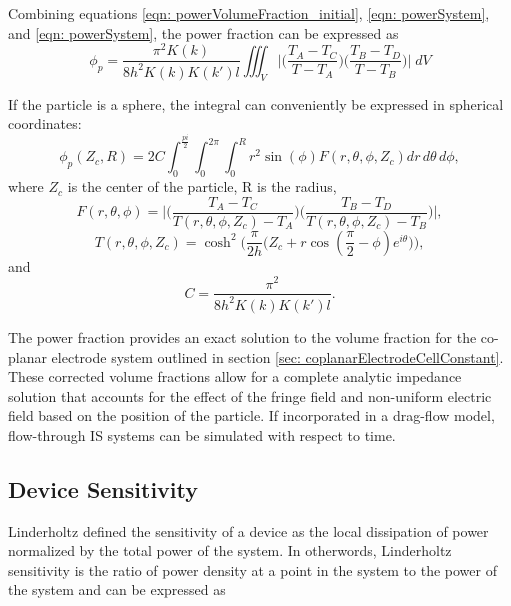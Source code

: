 Combining equations \ref{eqn: powerVolumeFraction_initial}, \ref{eqn: powerSystem}, and \ref{eqn: powerSystem}, the power fraction can be expressed as
\begin{equation}
    \phi_p = \frac{\pi^2 K(k)}{8h^2K(k)K(k')l}\iiint_V \bigg|\bigg(\frac{T_A-T_C}{T-T_A}\bigg)\bigg(\frac{T_B-T_D}{T-T_B}\bigg)\bigg| \;dV
\end{equation}

\par If the particle is a sphere, the integral can conveniently be expressed in spherical coordinates:
\begin{equation}
    \phi_p(Z_c,R) = 2C\int_{0}^\frac{pi}{2}\int_0^{2\pi}\int_0^R r^2 \sin(\phi)F(r,\theta,\phi,Z_c)dr\,d\theta\,d\phi,
\end{equation}
\noindent where $Z_c$ is the center of the particle, R is the radius,
\begin{equation}
    F(r,\theta,\phi) = \bigg|\bigg(\frac{T_A-T_C}{T(r,\theta,\phi,Z_c)-T_A}\bigg)\bigg(\frac{T_B-T_D}{T(r,\theta,\phi,Z_c)-T_B}\bigg)\bigg|,
\end{equation}
\begin{equation}
    T(r,\theta,\phi,Z_c) = \cosh^2\bigg(\frac{\pi}{2h}\Big(Z_c+r\cos(\frac{\pi}{2}-\phi)e^{i\theta}\Big)\bigg),
\end{equation}
\noindent and
\begin{equation}
    C = \frac{\pi^2}{8h^2K(k)K(k')l}.
\end{equation}

\par The power fraction provides an exact solution to the volume fraction for the co-planar electrode system outlined in section \ref{sec: coplanarElectrodeCellConstant}. These corrected volume fractions allow for a complete analytic impedance solution that accounts for the effect of the fringe field and non-uniform electric field based on the position of the particle. If incorporated in a drag-flow model, flow-through IS systems can be simulated with respect to time.


\subsection{Device Sensitivity}
\par Linderholtz defined the sensitivity of a device as the local dissipation of power normalized by the total power of the system. In otherwords, Linderholtz sensitivity is the ratio of power density at a point in the system to the power of the system and can be expressed as

